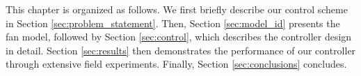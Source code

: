 This chapter is organized as follows. We first briefly describe our control scheme in Section \ref{sec:problem_statement}. 
Then, Section \ref{sec:model_id} presents the fan model, followed by Section \ref{sec:control}, which describes the controller design in detail. Section \ref{sec:results} then demonstrates the performance of our controller through extensive field experiments.
Finally, Section \ref{sec:conclusions} concludes.













